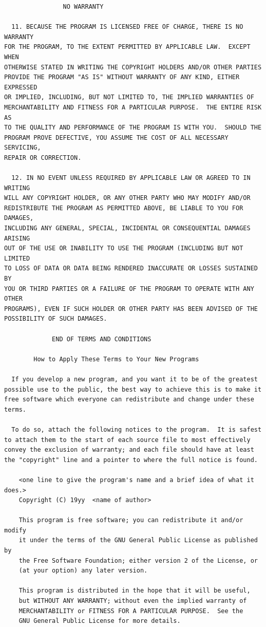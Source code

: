 \documentclass[a4paper,BCOR30mm,DIV14,pdftex,liststotoc,footsepline,openany]{scrbook}
\begin{document}
\begin{verbatim}
			    NO WARRANTY

  11. BECAUSE THE PROGRAM IS LICENSED FREE OF CHARGE, THERE IS NO WARRANTY
FOR THE PROGRAM, TO THE EXTENT PERMITTED BY APPLICABLE LAW.  EXCEPT WHEN
OTHERWISE STATED IN WRITING THE COPYRIGHT HOLDERS AND/OR OTHER PARTIES
PROVIDE THE PROGRAM "AS IS" WITHOUT WARRANTY OF ANY KIND, EITHER EXPRESSED
OR IMPLIED, INCLUDING, BUT NOT LIMITED TO, THE IMPLIED WARRANTIES OF
MERCHANTABILITY AND FITNESS FOR A PARTICULAR PURPOSE.  THE ENTIRE RISK AS
TO THE QUALITY AND PERFORMANCE OF THE PROGRAM IS WITH YOU.  SHOULD THE
PROGRAM PROVE DEFECTIVE, YOU ASSUME THE COST OF ALL NECESSARY SERVICING,
REPAIR OR CORRECTION.

  12. IN NO EVENT UNLESS REQUIRED BY APPLICABLE LAW OR AGREED TO IN WRITING
WILL ANY COPYRIGHT HOLDER, OR ANY OTHER PARTY WHO MAY MODIFY AND/OR
REDISTRIBUTE THE PROGRAM AS PERMITTED ABOVE, BE LIABLE TO YOU FOR DAMAGES,
INCLUDING ANY GENERAL, SPECIAL, INCIDENTAL OR CONSEQUENTIAL DAMAGES ARISING
OUT OF THE USE OR INABILITY TO USE THE PROGRAM (INCLUDING BUT NOT LIMITED
TO LOSS OF DATA OR DATA BEING RENDERED INACCURATE OR LOSSES SUSTAINED BY
YOU OR THIRD PARTIES OR A FAILURE OF THE PROGRAM TO OPERATE WITH ANY OTHER
PROGRAMS), EVEN IF SUCH HOLDER OR OTHER PARTY HAS BEEN ADVISED OF THE
POSSIBILITY OF SUCH DAMAGES.

		     END OF TERMS AND CONDITIONS

	    How to Apply These Terms to Your New Programs

  If you develop a new program, and you want it to be of the greatest
possible use to the public, the best way to achieve this is to make it
free software which everyone can redistribute and change under these terms.

  To do so, attach the following notices to the program.  It is safest
to attach them to the start of each source file to most effectively
convey the exclusion of warranty; and each file should have at least
the "copyright" line and a pointer to where the full notice is found.

    <one line to give the program's name and a brief idea of what it does.>
    Copyright (C) 19yy  <name of author>

    This program is free software; you can redistribute it and/or modify
    it under the terms of the GNU General Public License as published by
    the Free Software Foundation; either version 2 of the License, or
    (at your option) any later version.

    This program is distributed in the hope that it will be useful,
    but WITHOUT ANY WARRANTY; without even the implied warranty of
    MERCHANTABILITY or FITNESS FOR A PARTICULAR PURPOSE.  See the
    GNU General Public License for more details.


\end{verbatim}
\end{document}
